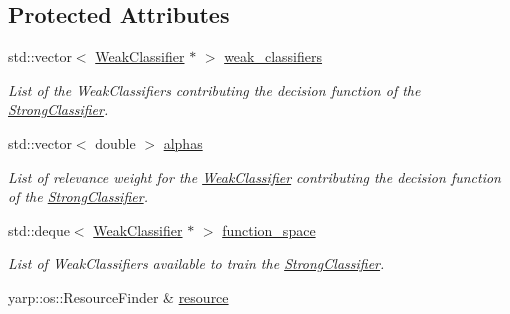 \subsection*{Protected Attributes}
\begin{DoxyCompactItemize}
\item 
std\+::vector$<$ \hyperlink{classiCub_1_1boostMIL_1_1WeakClassifier}{Weak\+Classifier} $\ast$ $>$ \hyperlink{classiCub_1_1boostMIL_1_1StrongClassifier_a24965a63cb180092a38d6e7f6274b045}{weak\+\_\+classifiers}\label{classiCub_1_1boostMIL_1_1StrongClassifier_a24965a63cb180092a38d6e7f6274b045}

\begin{DoxyCompactList}\small\item\em List of the Weak\+Classifiers contributing the decision function of the \hyperlink{classiCub_1_1boostMIL_1_1StrongClassifier}{Strong\+Classifier}. \end{DoxyCompactList}\item 
std\+::vector$<$ double $>$ \hyperlink{classiCub_1_1boostMIL_1_1StrongClassifier_a08d8327878ca52050f85f87b21d727fc}{alphas}\label{classiCub_1_1boostMIL_1_1StrongClassifier_a08d8327878ca52050f85f87b21d727fc}

\begin{DoxyCompactList}\small\item\em List of relevance weight for the \hyperlink{classiCub_1_1boostMIL_1_1WeakClassifier}{Weak\+Classifier} contributing the decision function of the \hyperlink{classiCub_1_1boostMIL_1_1StrongClassifier}{Strong\+Classifier}. \end{DoxyCompactList}\item 
std\+::deque$<$ \hyperlink{classiCub_1_1boostMIL_1_1WeakClassifier}{Weak\+Classifier} $\ast$ $>$ \hyperlink{classiCub_1_1boostMIL_1_1StrongClassifier_a6814b77760d7e6cd6b164c5ce7a3828e}{function\+\_\+space}\label{classiCub_1_1boostMIL_1_1StrongClassifier_a6814b77760d7e6cd6b164c5ce7a3828e}

\begin{DoxyCompactList}\small\item\em List of Weak\+Classifiers available to train the \hyperlink{classiCub_1_1boostMIL_1_1StrongClassifier}{Strong\+Classifier}. \end{DoxyCompactList}\item 
yarp\+::os\+::\+Resource\+Finder \& \hyperlink{classiCub_1_1boostMIL_1_1WeakClassifier_a5a7df0cc2cbb505e5b40dd59d3a4933b}{resource}\label{classiCub_1_1boostMIL_1_1WeakClassifier_a5a7df0cc2cbb505e5b40dd59d3a4933b}


\end{DoxyCompactItemize}
